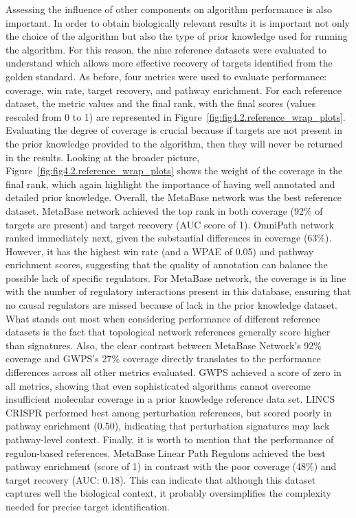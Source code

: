 Assessing the influence of other components on algorithm performance is also important. In order to obtain biologically relevant results it is important not only the choice of the algorithm but also the type of prior knowledge used for running the algorithm. For this reason, the nine reference datasets were evaluated to understand which allows more effective recovery of targets identified from the golden standard. As before, four metrics were used to evaluate performance: coverage, win rate, target recovery, and pathway enrichment. For each reference dataset, the metric values and the final rank, with the final scores (values rescaled from 0 to 1) are represented in Figure~\ref{fig:fig4.2.reference_wrap_plots}. Evaluating the degree of coverage is crucial because if targets are not present in the prior knowledge provided to the algorithm, then they will never be returned in the results. Looking at the broader picture, Figure~\ref{fig:fig4.2.reference_wrap_plots} shows the weight of the coverage in the final rank,  which again highlight the importance of having well annotated and detailed prior knowledge. Overall, the MetaBase network was the best reference dataset. MetaBase network achieved the top rank in both coverage (92\% of targets are present) and target recovery (\gls{AUC} score of 1). OmniPath network ranked immediately next, given the substantial differences in coverage (63\%).  However, it has the highest win rate (and a WPAE of 0.05) and pathway enrichment scores, suggesting that the quality of annotation can balance the possible lack of specific regulators. For MetaBase network, the coverage is in line with the number of regulatory interactions present in this database, ensuring that no causal regulators are missed because of lack in the prior knowledge dataset. What stands out most when considering performance of different reference datasets is the fact that topological network references generally score higher than signatures. Also, the clear contrast between MetaBase Network's 92\% coverage and GWPS's 27\% coverage directly translates to the performance differences across all other metrics evaluated. GWPS achieved a score of zero in all metrics, showing that even sophisticated algorithms cannot overcome insufficient molecular coverage in a prior knowledge reference data set. LINCS CRISPR performed best among perturbation references, but scored poorly in pathway enrichment (0.50), indicating that perturbation signatures may lack pathway-level context. Finally, it is worth to mention that the performance of regulon-based references. MetaBase Linear Path Regulons achieved the best pathway enrichment (score of 1) in contrast with the poor coverage (48\%) and target recovery (\gls{AUC}: 0.18). This can indicate that although this dataset captures well the biological context, it probably oversimplifies the complexity needed for precise target identification.


